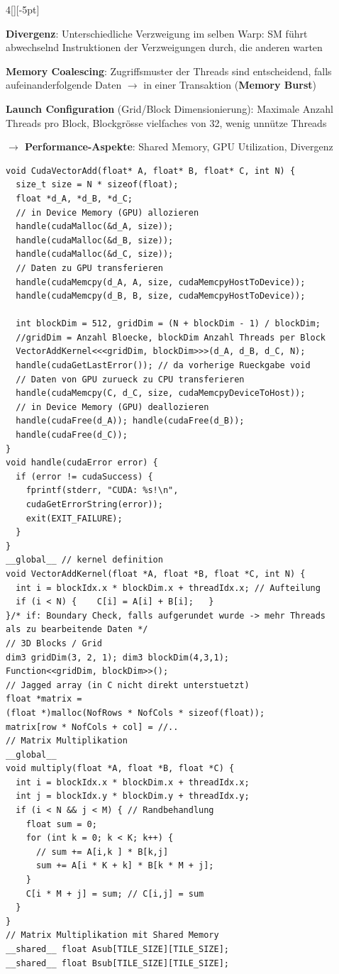 \documentclass[%
	pdftex,%
	a4paper,%
	landscape,%
	ngerman,
	oneside,%
	6pt,%
	halfparskip,%
]{scrbook}
\newenvironment{tight-itemize}
{ \begin{itemize}[leftmargin=*, nosep]
    \setlength{\itemsep}{0px}
    \setlength{\parskip}{0px}
    \setlength{\parsep}{0px}  }
{ \end{itemize}                  }
\begin{document}
\begin{multicols}{4}[][-5pt]
\begin{tight-itemize}
    \item{\textbf{Divergenz}: Unterschiedliche Verzweigung im selben Warp: SM führt abwechselnd Instruktionen der Verzweigungen durch, die anderen warten}
    \item{\textbf{Memory Coalescing}: Zugriffsmuster der Threads sind entscheidend, falls aufeinanderfolgende Daten $\rightarrow$ in einer Transaktion (\textbf{Memory Burst})}
    \item{\textbf{Launch Configuration} (Grid/Block Dimensionierung): Maximale Anzahl Threads pro Block, Blockgrösse vielfaches von 32, wenig unnütze Threads}
    \item{\textbf{$\rightarrow$ Performance-Aspekte}: Shared Memory, GPU Utilization, Divergenz}
\end{tight-itemize}

\begin{lstlisting}
void CudaVectorAdd(float* A, float* B, float* C, int N) {
  size_t size = N * sizeof(float);
  float *d_A, *d_B, *d_C;
  // in Device Memory (GPU) allozieren
  handle(cudaMalloc(&d_A, size)); 
  handle(cudaMalloc(&d_B, size));
  handle(cudaMalloc(&d_C, size));
  // Daten zu GPU transferieren
  handle(cudaMemcpy(d_A, A, size, cudaMemcpyHostToDevice));
  handle(cudaMemcpy(d_B, B, size, cudaMemcpyHostToDevice));
  
  int blockDim = 512, gridDim = (N + blockDim - 1) / blockDim;
  //gridDim = Anzahl Bloecke, blockDim Anzahl Threads per Block
  VectorAddKernel<<<gridDim, blockDim>>>(d_A, d_B, d_C, N);
  handle(cudaGetLastError()); // da vorherige Rueckgabe void
  // Daten von GPU zurueck zu CPU transferieren
  handle(cudaMemcpy(C, d_C, size, cudaMemcpyDeviceToHost));
  // in Device Memory (GPU) deallozieren
  handle(cudaFree(d_A)); handle(cudaFree(d_B));
  handle(cudaFree(d_C));
}
void handle(cudaError error) {
  if (error != cudaSuccess) {
    fprintf(stderr, "CUDA: %s!\n",
    cudaGetErrorString(error));
    exit(EXIT_FAILURE);
  }
}
__global__ // kernel definition
void VectorAddKernel(float *A, float *B, float *C, int N) {
  int i = blockIdx.x * blockDim.x + threadIdx.x; // Aufteilung
  if (i < N) {    C[i] = A[i] + B[i];   }
}/* if: Boundary Check, falls aufgerundet wurde -> mehr Threads
als zu bearbeitende Daten */
// 3D Blocks / Grid
dim3 gridDim(3, 2, 1); dim3 blockDim(4,3,1);
Function<<gridDim, blockDim>>();
// Jagged array (in C nicht direkt unterstuetzt)
float *matrix =
(float *)malloc(NofRows * NofCols * sizeof(float));
matrix[row * NofCols + col] = //..
// Matrix Multiplikation
__global__
void multiply(float *A, float *B, float *C) {
  int i = blockIdx.x * blockDim.x + threadIdx.x;
  int j = blockIdx.y * blockDim.y + threadIdx.y;
  if (i < N && j < M) { // Randbehandlung
    float sum = 0;
    for (int k = 0; k < K; k++) {
      // sum += A[i,k ] * B[k,j]
      sum += A[i * K + k] * B[k * M + j];
    }
    C[i * M + j] = sum; // C[i,j] = sum
  }
}
// Matrix Multiplikation mit Shared Memory
__shared__ float Asub[TILE_SIZE][TILE_SIZE];
__shared__ float Bsub[TILE_SIZE][TILE_SIZE];


\end{lstlisting}
\end{multicols}
\end{document}
